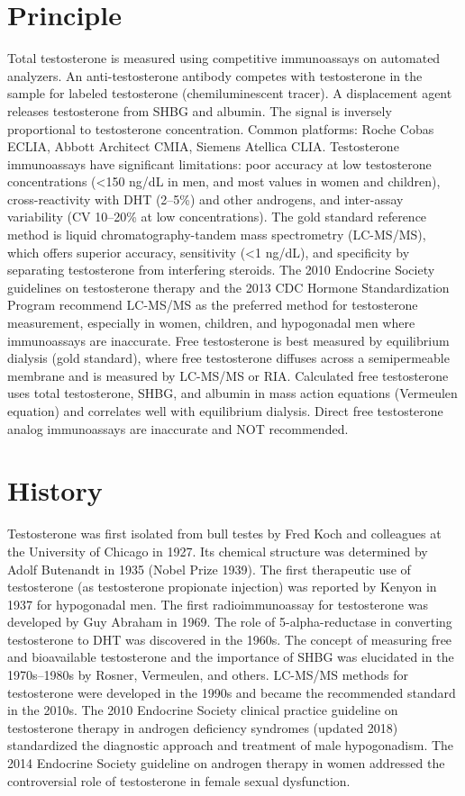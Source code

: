 \section*{Principle}
Total testosterone is measured using competitive immunoassays on automated analyzers. An anti-testosterone antibody competes with testosterone in the sample for labeled testosterone (chemiluminescent tracer). A displacement agent releases testosterone from SHBG and albumin. The signal is inversely proportional to testosterone concentration. Common platforms: Roche Cobas ECLIA, Abbott Architect CMIA, Siemens Atellica CLIA. Testosterone immunoassays have significant limitations: poor accuracy at low testosterone concentrations (<150 ng/dL in men, and most values in women and children), cross-reactivity with DHT (2--5\%) and other androgens, and inter-assay variability (CV 10--20\% at low concentrations). The gold standard reference method is liquid chromatography-tandem mass spectrometry (LC-MS/MS), which offers superior accuracy, sensitivity (<1 ng/dL), and specificity by separating testosterone from interfering steroids. The 2010 Endocrine Society guidelines on testosterone therapy and the 2013 CDC Hormone Standardization Program recommend LC-MS/MS as the preferred method for testosterone measurement, especially in women, children, and hypogonadal men where immunoassays are inaccurate. Free testosterone is best measured by equilibrium dialysis (gold standard), where free testosterone diffuses across a semipermeable membrane and is measured by LC-MS/MS or RIA. Calculated free testosterone uses total testosterone, SHBG, and albumin in mass action equations (Vermeulen equation) and correlates well with equilibrium dialysis. Direct free testosterone analog immunoassays are inaccurate and NOT recommended.

\section*{History}
Testosterone was first isolated from bull testes by Fred Koch and colleagues at the University of Chicago in 1927. Its chemical structure was determined by Adolf Butenandt in 1935 (Nobel Prize 1939). The first therapeutic use of testosterone (as testosterone propionate injection) was reported by Kenyon in 1937 for hypogonadal men. The first radioimmunoassay for testosterone was developed by Guy Abraham in 1969. The role of 5-alpha-reductase in converting testosterone to DHT was discovered in the 1960s. The concept of measuring free and bioavailable testosterone and the importance of SHBG was elucidated in the 1970s--1980s by Rosner, Vermeulen, and others. LC-MS/MS methods for testosterone were developed in the 1990s and became the recommended standard in the 2010s. The 2010 Endocrine Society clinical practice guideline on testosterone therapy in androgen deficiency syndromes (updated 2018) standardized the diagnostic approach and treatment of male hypogonadism. The 2014 Endocrine Society guideline on androgen therapy in women addressed the controversial role of testosterone in female sexual dysfunction.

